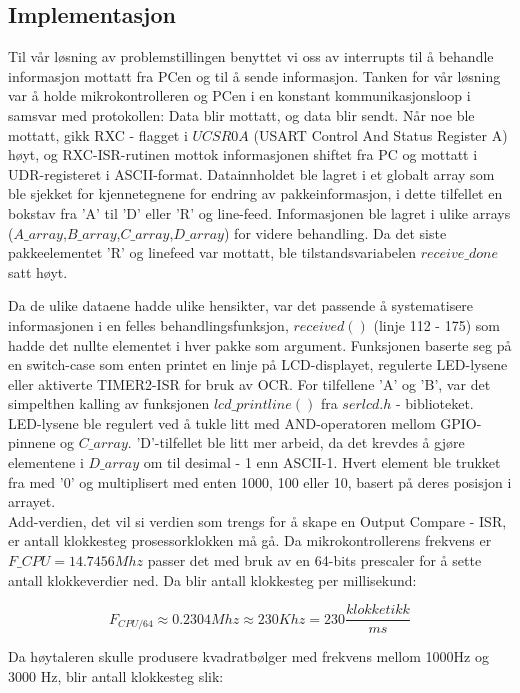 \documentclass[12pt, a4paper]{report}
\begin{document}
\subsection{Implementasjon}
Til vår løsning av problemstillingen benyttet vi oss av interrupts til å behandle informasjon mottatt fra PCen og til å sende informasjon. Tanken for vår løsning var å holde mikrokontrolleren og PCen i en konstant kommunikasjonsloop i samsvar med protokollen: Data blir mottatt, og data blir sendt. Når noe ble mottatt, gikk RXC - flagget i $UCSR0A$ (USART Control And Status Register A) høyt, og RXC-ISR-rutinen mottok informasjonen shiftet fra PC og mottatt i UDR-registeret i ASCII-format. Datainnholdet ble lagret i et globalt array som ble sjekket for kjennetegnene for endring av pakkeinformasjon, i dette tilfellet en bokstav fra 'A' til 'D' eller 'R' og line-feed. Informasjonen ble lagret i ulike arrays ($A\_array$,$B\_array$,$C\_array$,$D\_array$) for videre behandling. Da det siste pakkeelementet 'R' og linefeed var mottatt, ble tilstandsvariabelen $receive\_done$ satt høyt.

Da de ulike dataene hadde ulike hensikter, var det passende å systematisere informasjonen i en felles behandlingsfunksjon, $received()$ (linje 112 - 175) som hadde det nullte elementet i hver pakke som argument. Funksjonen baserte seg på en switch-case som enten printet en linje på LCD-displayet, regulerte LED-lysene eller aktiverte TIMER2-ISR for bruk av OCR. For tilfellene 'A' og 'B', var det simpelthen kalling av funksjonen $lcd\_printline()$ fra $serlcd.h$ - biblioteket. LED-lysene ble regulert ved å tukle litt med AND-operatoren mellom GPIO-pinnene og $C\_array$. 'D'-tilfellet ble litt mer arbeid, da det krevdes å gjøre elementene i $D\_array$ om til desimal - 1 enn ASCII-1. Hvert element ble trukket fra med '0' og multiplisert med enten 1000, 100 eller 10, basert på deres posisjon i arrayet.\\
Add-verdien, det vil si verdien som trengs for å skape en Output Compare - ISR, er antall klokkesteg prosessorklokken må gå. Da mikrokontrollerens frekvens er $F\_CPU = 14.7456Mhz$ passer det med bruk av en 64-bits prescaler for å sette antall klokkeverdier ned. Da blir antall klokkesteg per millisekund:

\begin{equation}
F_{CPU\slash{64}} \approx 0.2304Mhz \approx 230Khz = 230 \frac{klokketikk}{ms}
\end{equation}

Da høytaleren skulle produsere kvadratbølger med frekvens mellom 1000Hz og 3000 Hz, blir antall klokkesteg slik:
\end{document}
